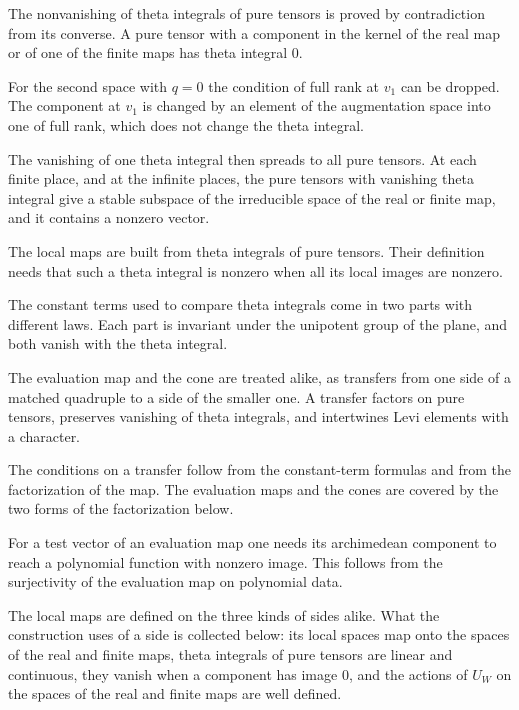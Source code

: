The nonvanishing of theta integrals of pure tensors is proved by contradiction
from its converse. A pure tensor with a component in the kernel of the real
map or of one of the finite maps has theta integral $0$.

For the second space with $q=0$ the condition of full rank at $v_1$ can be
dropped. The component at $v_1$ is changed by an element of the augmentation
space into one of full rank, which does not change the theta integral.

The vanishing of one theta integral then spreads to all pure tensors. At each
finite place, and at the infinite places, the pure tensors with vanishing theta
integral give a stable subspace of the irreducible space of the real or finite
map, and it contains a nonzero vector.

The local maps are built from theta integrals of pure tensors. Their
definition needs that such a theta integral is nonzero when all its local
images are nonzero.

The constant terms used to compare theta integrals come in two parts with
different laws. Each part is invariant under the unipotent group of the
plane, and both vanish with the theta integral.

The evaluation map and the cone are treated alike, as transfers from one
side of a matched quadruple to a side of the smaller one. A transfer
factors on pure tensors, preserves vanishing of theta integrals, and
intertwines Levi elements with a character.

The conditions on a transfer follow from the constant-term formulas and from
the factorization of the map. The evaluation maps and the cones are covered
by the two forms of the factorization below.

For a test vector of an evaluation map one needs its archimedean component
to reach a polynomial function with nonzero image. This follows from the
surjectivity of the evaluation map on polynomial data.

The local maps are defined on the three kinds of sides alike. What the
construction uses of a side is collected below: its local spaces map onto the
spaces of the real and finite maps, theta integrals of pure tensors are linear
and continuous, they vanish when a component has image $0$, and the actions of
$U_W$ on the spaces of the real and finite maps are well defined.

